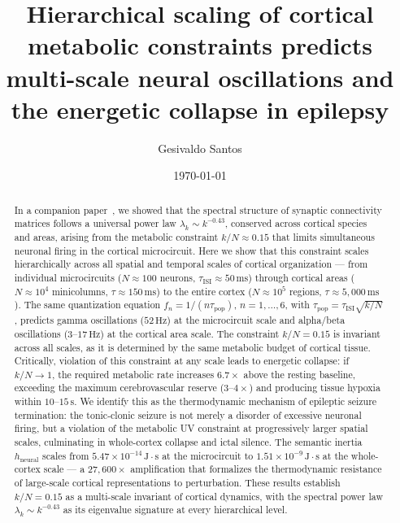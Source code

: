 \documentclass[aps,pre,twocolumn,showpacs,superscriptaddress,longbibliography]{revtex4-2}
\newcommand{\kN}{k/N}
\newcommand{\taupop}{\tau_{\mathrm{pop}}}
\newcommand{\tauISI}{\tau_{\mathrm{ISI}}}
\newcommand{\hneu}{h_{\mathrm{neural}}}
\begin{document}
\title{Hierarchical scaling of cortical metabolic constraints
       predicts multi-scale neural oscillations and
       the energetic collapse in epilepsy}

\author{Gesivaldo Santos}

\date{\today}

\begin{abstract}
In a companion paper~\cite{Santos2025a}, we showed that the
spectral structure of synaptic connectivity matrices follows
a universal power law $\lambda_k \sim k^{-0.43}$, conserved
across cortical species and areas, arising from the metabolic
constraint $\kN \approx 0.15$ that limits simultaneous neuronal
firing in the cortical microcircuit. Here we show that this
constraint scales hierarchically across all spatial and temporal
scales of cortical organization --- from individual microcircuits
($N \approx 100$ neurons, $\tauISI \approx 50\,\mathrm{ms}$)
through cortical areas ($N \approx 10^4$ minicolumns,
$\tau \approx 150\,\mathrm{ms}$) to the entire cortex
($N \approx 10^5$ regions, $\tau \approx 5{,}000\,\mathrm{ms}$).
The same quantization equation $f_n = 1/(n\taupop)$,
$n = 1,\ldots,6$, with $\taupop = \tauISI\sqrt{\kN}$,
predicts gamma oscillations ($52\,\mathrm{Hz}$) at the
microcircuit scale and alpha/beta oscillations ($3$--$17\,\mathrm{Hz}$)
at the cortical area scale. The constraint $\kN = 0.15$ is
invariant across all scales, as it is determined by the same
metabolic budget of cortical tissue. Critically, violation of
this constraint at any scale leads to energetic collapse: if
$\kN \to 1$, the required metabolic rate increases $6.7\times$
above the resting baseline, exceeding the maximum cerebrovascular
reserve ($3$--$4\times$) and producing tissue hypoxia within
$10$--$15\,\mathrm{s}$. We identify this as the thermodynamic
mechanism of epileptic seizure termination: the tonic-clonic
seizure is not merely a disorder of excessive neuronal firing,
but a violation of the metabolic UV constraint at progressively
larger spatial scales, culminating in whole-cortex collapse and
ictal silence. The semantic inertia $\hneu$ scales from
$5.47 \times 10^{-14}\,\mathrm{J\cdot s}$ at the microcircuit
to $1.51 \times 10^{-9}\,\mathrm{J\cdot s}$ at the whole-cortex
scale --- a $27{,}600\times$ amplification that formalizes the
thermodynamic resistance of large-scale cortical representations
to perturbation. These results establish $\kN = 0.15$ as a
multi-scale invariant of cortical dynamics, with the spectral
power law $\lambda_k \sim k^{-0.43}$ as its eigenvalue
signature at every hierarchical level.
\end{abstract}
\end{document}
